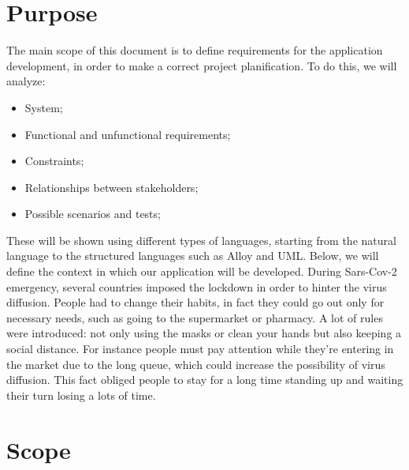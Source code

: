 \section{Purpose}
The main scope of this document is to define requirements for the application development, in order to make a correct project planification. 
To do this, we will analyze:

\begin{itemize}
\item System;
\item Functional and unfunctional requirements;
\item Constraints;
\item Relationships between stakeholders;
\item Possible scenarios and tests;
\end{itemize}
\medskip
These will be shown using different types of languages, starting from the natural language to the structured languages such as Alloy and UML.
Below, we will define the context in which our application will be developed.
During Sars-Cov-2 emergency, several countries imposed the lockdown in order to hinter the virus diffusion.
People had to change their habits, in fact they could go out only for necessary needs, such as going to the supermarket or pharmacy.
A lot of rules were introduced: not only using the masks or clean your hands but also keeping a social distance.
For instance people must pay attention while they're entering in the market due to the long queue, which could increase the possibility of virus diffusion.
This fact obliged people to stay for a long time standing up and waiting their turn losing a lots of time. 




\section{Scope}

